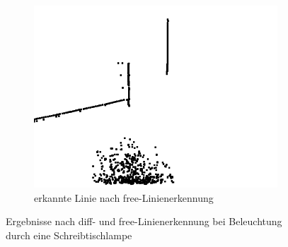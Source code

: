 \documentclass[ngerman,a4paper,parskip=half]{scrartcl}
\begin{document}
\begin{figure}[H]
\begin{subfigure}{0.32\textwidth}
		\includegraphics[width=\textwidth]{includes/blue_d_free.png}
		\caption{erkannte Linie nach free-Linienerkennung}
		\label{fig:blue_d_free}
	\end{subfigure}
	\caption{Ergebnisse nach diff- und free-Linienerkennung bei Beleuchtung durch eine Schreibtischlampe}
	\label{fig:blue_d}
\end{figure}
\end{document}
